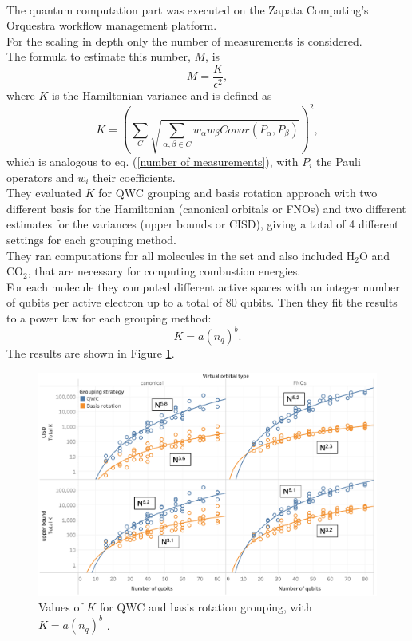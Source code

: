 \\
The quantum computation part was executed on the Zapata Computing's Orquestra workflow management platform. \\
For the scaling in depth only the number of measurements is considered. \\
The formula to estimate this number, $M$, is
\begin{equation}
    M = \frac{K}{\epsilon^2},
\end{equation}
where $K$ is the Hamiltonian variance and is defined as
\begin{equation}
    K = \left( \sum_C \sqrt{\sum_{\alpha, \beta \in C} w_{\alpha} w_{\beta} Covar(P_{\alpha}, P_{\beta}) } \right)^2,
\end{equation}
which is analogous to eq. (\ref{number of measurements}), with $P_i$ the Pauli operators and $w_i$ their coefficients. \\
They evaluated $K$ for QWC grouping and basis rotation approach with two different basis for the Hamiltonian (canonical orbitals or FNOs) and two different estimates for the variances (upper bounds or CISD), giving a total of 4 different settings for each grouping method. \\
They ran computations for all molecules in the set and also included H$_2$O and CO$_2$, that are necessary for computing combustion energies. \\
For each molecule they computed different active spaces with an integer number of
qubits per active electron up to a total of 80 qubits. Then they fit the results to a power law for each grouping method:
\begin{equation}
    K = a(n_q)^b.
\end{equation}
The results are shown in Figure \ref{K values}.
\begin{figure}[ht]
  \centering
  \includegraphics[width=\textwidth]{figures/Values of K for QWC and basis rotation grouping.png}
  \caption{Values of $K$ for QWC and basis rotation grouping, with $K = a(n_q)^b$ \cite{Gonthier2020Dec}.} \label{K values}
\end{figure} \\

